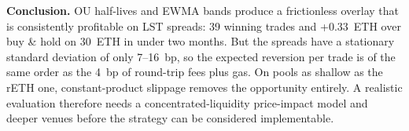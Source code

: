 \documentclass[10pt,a4paper]{article}
\begin{document}
\textbf{Conclusion.} OU half-lives and EWMA bands produce a frictionless overlay that is
consistently profitable on LST spreads: 39 winning trades and +0.33~ETH over buy \& hold
on 30~ETH in under two months. But the spreads have a stationary standard deviation of
only 7--16~bp, so the expected reversion per trade is of the same order as the 4~bp of
round-trip fees plus gas. On pools as shallow as the rETH one, constant-product
slippage removes the opportunity entirely. A realistic evaluation therefore needs a
concentrated-liquidity price-impact model and deeper venues before the strategy can be
considered implementable.

\vspace{2mm}
\end{document}
